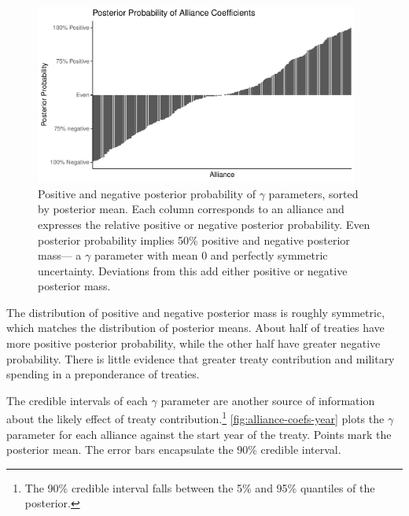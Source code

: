 \documentclass[12pt]{article}
\begin{document}
\begin{figure}[htbp]
	\centering
		\includegraphics[width=0.95\textwidth]{full-post-prob.pdf}
	\caption{Positive and negative posterior probability of $\gamma$ parameters, sorted by posterior mean. Each column corresponds to an alliance and expresses the relative positive or negative posterior probability. Even posterior probability implies 50\% positive and negative posterior mass--- a $\gamma$ parameter with mean 0 and perfectly symmetric uncertainty. Deviations from this add either positive or negative posterior mass.}
	\label{fig:full-post-prob}
\end{figure}


The distribution of positive and negative posterior mass is roughly symmetric, which matches the distribution of posterior means. 
About half of treaties have more positive posterior probability, while the other half have greater negative probability. 
There is little evidence that greater treaty contribution and military spending in a preponderance of treaties. 


The credible intervals of each $\gamma$ parameter are another source of information about the likely effect of treaty contribution.\footnote{The 90\% credible interval falls between the 5\% and 95\% quantiles of the posterior.} 
\autoref{fig:alliance-coefs-year} plots the $\gamma$ parameter for each alliance against the start year of the treaty.
Points mark the posterior mean. 
The error bars encapsulate the 90\% credible interval.
\end{document}
